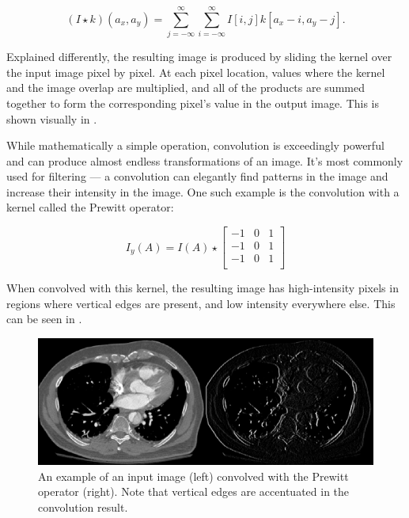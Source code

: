 \begin{equation}
(I \star k)(a_x, a_y) = \sum_{j=-\infty}^{\infty} \sum_{i=-\infty}^{\infty} I[i, j] k[a_x - i, a_y - j].
\end{equation}
 
Explained differently, the resulting image is produced by sliding the kernel over the input image pixel by pixel. At each pixel location, values where the kernel and the image overlap are multiplied, and all of the products are summed together to form the corresponding pixel's value in the output image. This is shown visually in .

While mathematically a simple operation, convolution is exceedingly powerful and can produce almost endless transformations of an image. It's most commonly used for filtering --- a convolution can elegantly find patterns in the image and increase their intensity in the image. One such example is the convolution with a kernel called the Prewitt operator:

\begin{equation}
I_y(A) = I(A) \star \begin{bmatrix}
-1 & 0 & 1\\
-1 & 0 & 1\\
-1 & 0 & 1\\
\end{bmatrix}
\end{equation}

When convolved with this kernel, the resulting image has high-intensity pixels in regions where vertical edges are present, and low intensity everywhere else. This can be seen in .

\begin{figure}[h!]
 \centering
 \includegraphics[width=\linewidth]{images/prewitt-example.png}
 \caption{An example of an input image (left) convolved with the Prewitt operator (right). Note that vertical edges are accentuated in the convolution result.}
 \label{fig:prewitt-example}
 \end{figure}

